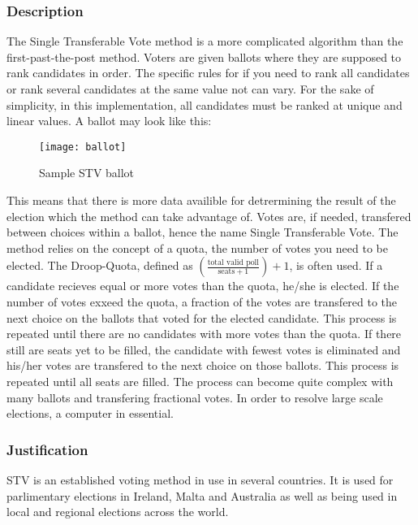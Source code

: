 \subsubsection{Description}
The Single Transferable Vote method is a more complicated algorithm than the first-past-the-post method. Voters are given ballots where they are supposed to rank candidates in order. The specific rules for if you need to rank all candidates or rank several candidates at the same value not can vary. For the sake of simplicity, in this implementation, all candidates must be ranked at unique and linear values. A ballot may look like this:
\begin{figure}[H]
	\centering
	\texttt{[image: ballot]}
	\caption{Sample STV ballot}
	\label{STV ballot}
\end{figure}
This means that there is more data availible for detrermining the result of the election which the method can take advantage of. Votes are, if needed, transfered between choices within a ballot, hence the name Single Transferable Vote. The method relies on the concept of a quota, the number of votes you need to be elected. The Droop-Quota, defined as $(\frac{\text{total valid poll}}{\text{seats} + 1})+1$, is often used. If a candidate recieves equal or more votes than the quota, he/she is elected. If the number of votes exxeed the quota, a fraction of the votes are transfered to the next choice on the ballots that voted for the elected candidate. This process is repeated until there are no candidates with more votes than the quota. If there still are seats yet to be filled, the candidate with fewest votes is eliminated and his/her votes are transfered to the next choice on those ballots. This process is repeated until all seats are filled. The process can become quite complex with many ballots and transfering fractional votes. In order to resolve large scale elections, a computer in essential.
\subsubsection{Justification}
STV is an established voting method in use in several countries. It is used for parlimentary elections in Ireland, Malta and Australia as well as being used in local and regional elections across the world.
